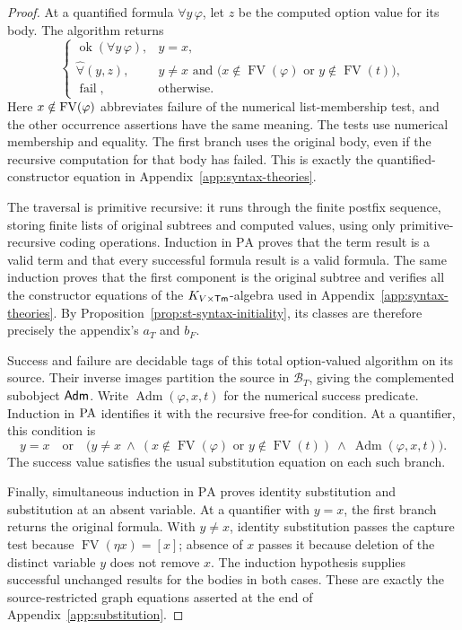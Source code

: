 \begin{proof}
At a quantified formula $\forall y\,\varphi$, let $z$ be the
computed option value for its body. The algorithm returns
\[
 \begin{cases}
  \operatorname{ok}(\forall y\,\varphi),&y=x,\\
  \widehat\forall(y,z),&y\ne x\text{ and }
       \bigl(x\notin\operatorname{FV}(\varphi)
             \text{ or }y\notin\operatorname{FV}(t)\bigr),\\
  \operatorname{fail},&\text{otherwise}.
 \end{cases}
\]
Here $x\notin\operatorname{FV}(\varphi)$ abbreviates failure of the numerical
list-membership test, and the other occurrence assertions have the
same meaning. The tests use numerical membership and equality. The first branch uses the original body, even if
the recursive computation for that body has failed. This is exactly
the quantified-constructor equation in Appendix~\ref{app:syntax-theories}.

The traversal is primitive recursive: it runs through the finite
postfix sequence, storing finite lists of original subtrees and
computed values, using only primitive-recursive coding operations.
Induction in $\mathrm{PA}$ proves that the term result is a valid
term and that every successful formula result is a valid formula.
The same induction proves that the first component is the original
subtree and verifies all the constructor equations of the
$K_{V\times\mathsf{Tm}}$-algebra used in Appendix~\ref{app:syntax-theories}.
By Proposition~\ref{prop:st-syntax-initiality}, its classes are
therefore precisely the appendix's $a_T$ and $b_F$.

Success and failure are decidable tags of this total option-valued
algorithm on its source. Their inverse images partition the source
in $\mathcal B_T$, giving the complemented subobject $\mathsf{Adm}$.
Write $\operatorname{Adm}(\varphi,x,t)$ for the numerical success
predicate. Induction in $\mathrm{PA}$ identifies it with the recursive
free-for condition. At a quantifier, this condition is
\[
 y=x\quad\text{or}\quad
 \bigl(y\ne x\ \land\
   (x\notin\operatorname{FV}(\varphi)
        \text{ or }y\notin\operatorname{FV}(t))\ \land\
   \operatorname{Adm}(\varphi,x,t)\bigr).
\]
The success value satisfies the usual substitution equation on
each such branch.

Finally, simultaneous induction in $\mathrm{PA}$ proves identity
substitution and substitution at an absent variable. At a
quantifier with $y=x$, the first branch returns the original
formula. With $y\ne x$, identity substitution passes the capture
test because $\operatorname{FV}(\eta x)=[x]$; absence of $x$
passes it because deletion of the distinct variable $y$ does not
remove $x$. The induction hypothesis supplies successful unchanged
results for the bodies in both cases. These are exactly the
source-restricted graph equations asserted at the end of
Appendix~\ref{app:substitution}.
\end{proof}


